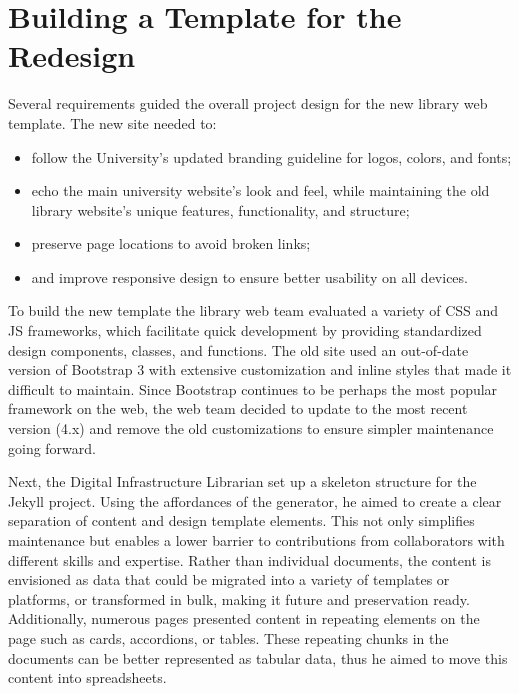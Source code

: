 \documentclass{book}
\providecommand{\tightlist}{%
  \setlength{\itemsep}{0pt}\setlength{\parskip}{0pt}}
\begin{document}
\hypertarget{building-a-template-for-the-redesign}{%
\section{Building a Template for the
Redesign}\label{building-a-template-for-the-redesign}}

Several requirements guided the overall project design for the new library web
template. The new site needed to:

\begin{itemize}
\tightlist
\item
  follow the University's updated branding guideline for logos, colors, and
  fonts;
\item
  echo the main university website's look and feel, while maintaining the old
  library website's unique features, functionality, and structure;
\item
  preserve page locations to avoid broken links;
\item
  and improve responsive design to ensure better usability on all devices.
\end{itemize}

To build the new template the library web team evaluated a variety of CSS and
JS frameworks, which facilitate quick development by providing standardized
design components, classes, and functions. The old site used an out-of-date
version of Bootstrap 3 with extensive customization and inline styles that
made it difficult to maintain. Since Bootstrap continues to be perhaps the
most popular framework on the web, the web team decided to update to the most
recent version (4.x) and remove the old customizations to ensure simpler
maintenance going forward.

Next, the Digital Infrastructure Librarian set up a skeleton structure for the
Jekyll project. Using the affordances of the generator, he aimed to create a
clear separation of content and design template elements. This not only
simplifies maintenance but enables a lower barrier to contributions from
collaborators with different skills and expertise. Rather than individual
documents, the content is envisioned as data that could be migrated into a
variety of templates or platforms, or transformed in bulk, making it future
and preservation ready. Additionally, numerous pages presented content in
repeating elements on the page such as cards, accordions, or tables. These
repeating chunks in the documents can be better represented as tabular data,
thus he aimed to move this content into spreadsheets.
\end{document}
